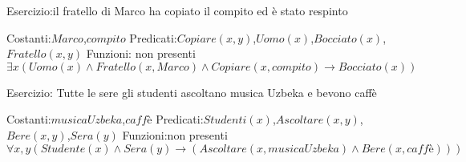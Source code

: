 Esercizio:il fratello di Marco ha copiato il compito ed è stato respinto

Costanti:$Marco$,$compito$
Predicati:$Copiare(x,y)$,$Uomo(x)$,$Bocciato(x)$,$Fratello(x,y)$
Funzioni: non presenti
\begin{equation*}
    \exists x (Uomo(x) \land Fratello(x,Marco) \land Copiare(x,compito) \rightarrow Bocciato(x))
\end{equation*}

Esercizio: Tutte le sere gli studenti ascoltano musica Uzbeka e bevono caffè

Costanti:$musicaUzbeka$,$caffè$
Predicati:$Studenti(x)$,$Ascoltare(x,y)$,$Bere(x,y)$,$Sera(y)$
Funzioni:non presenti
\begin{equation*}
\forall x,y (Studente(x) \land Sera(y) \rightarrow (Ascoltare(x,musicaUzbeka) \land Bere(x,caffè)))
\end{equation*}
